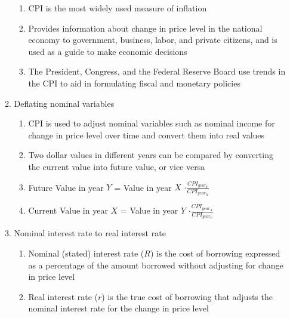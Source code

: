 \documentclass[12pt]{article}
\begin{document}
\begin{enumerate}
\begin{enumerate}
            \begin{enumerate}

              \item CPI is the most widely used measure of inflation

              \item Provides information about change in price level in the national economy to government, business, labor, and private citizens, and is used as a guide to make economic decisions

              \item The President, Congress, and the Federal Reserve Board use trends in the CPI to aid in formulating fiscal and monetary policies

            \end{enumerate}

          \item Deflating nominal variables

            \begin{enumerate}

              \item CPI is used to adjust nominal variables such as nominal income for change in price level over time and convert them into real values

              \item Two dollar values in different years can be compared by converting the current value into future value, or vice versa

              \item Future Value in year $Y$ = Value in year $X$ $\cdot\frac{CPI_{year_Y}}{CPI_{year_X}}$

              \item Current Value in year $X$ = Value in year $Y$ $\cdot\frac{CPI_{year_X}}{CPI_{year_Y}}$

            \end{enumerate}

          \item Nominal interest rate to real interest rate

            \begin{enumerate}

              \item Nominal (stated) interest rate ($R$) is the cost of borrowing expressed as a percentage of the amount borrowed without adjusting for change in price level

              \item Real interest rate ($r$) is the true cost of borrowing that adjusts the nominal interest rate for the change in price level


\end{enumerate}
\end{enumerate}
\end{enumerate}
\end{document}
